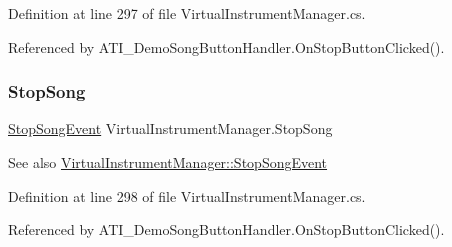 Definition at line 297 of file Virtual\+Instrument\+Manager.\+cs.



Referenced by A\+T\+I\+\_\+\+Demo\+Song\+Button\+Handler.\+On\+Stop\+Button\+Clicked().

\mbox{\label{group___v_i_m_events_gaa9e464629814abf2e4db88e240fac72c}} 
\subsubsection{\texorpdfstring{Stop\+Song}{StopSong}}
{\footnotesize\ttfamily \hyperlink{group___v_i_m_event_types_class_virtual_instrument_manager_1_1_stop_song_event}{Stop\+Song\+Event} Virtual\+Instrument\+Manager.\+Stop\+Song}

\begin{DoxySeeAlso}{See also}
\hyperlink{group___v_i_m_event_types_class_virtual_instrument_manager_1_1_stop_song_event}{Virtual\+Instrument\+Manager\+::\+Stop\+Song\+Event} 
\end{DoxySeeAlso}


Definition at line 298 of file Virtual\+Instrument\+Manager.\+cs.



Referenced by A\+T\+I\+\_\+\+Demo\+Song\+Button\+Handler.\+On\+Stop\+Button\+Clicked().

